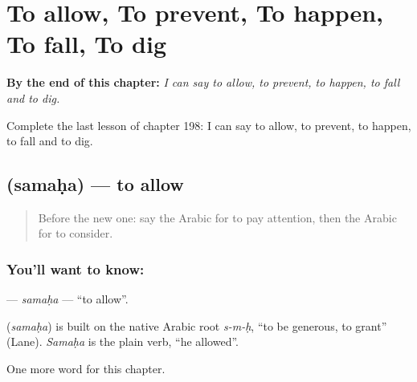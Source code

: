 
\chapter{To allow, To prevent, To happen, To fall, To dig}
\label{ch:ar-to-allow-to-prevent-to-happen-to-fall-to-dig}

\begin{chapteropening}
\textbf{By the end of this chapter:} \emph{I can say to allow, to prevent, to happen, to fall and to dig.}

Complete the last lesson of chapter 198: I can say to allow, to prevent, to happen, to fall and to dig.
\end{chapteropening}

\section[\texorpdfstring{\ar{سمح} (samaḥa)}{سمح (samaḥa)}]{ (samaḥa) — to allow}

\label{lesson:AR-C198-samaha}



\begin{quote}
Before the new one: say the Arabic for to pay attention, then the Arabic for to consider.
\end{quote}

\subsection*{You'll want to know: }
\textbf{} — \emph{samaḥa} — \textquotedblleft{}to allow\textquotedblright{}.

\begin{cousinweb}
\textbf{} (\emph{samaḥa}) is built on the native Arabic root \emph{s-m-ḥ}, \textquotedblleft{}to be generous, to grant\textquotedblright{} (Lane). \emph{Samaḥa} is the plain verb, \textquotedblleft{}he allowed\textquotedblright{}.
\end{cousinweb}

\begin{grammarlens}[title={What you've built}]
One more word for this chapter.
\end{grammarlens}

